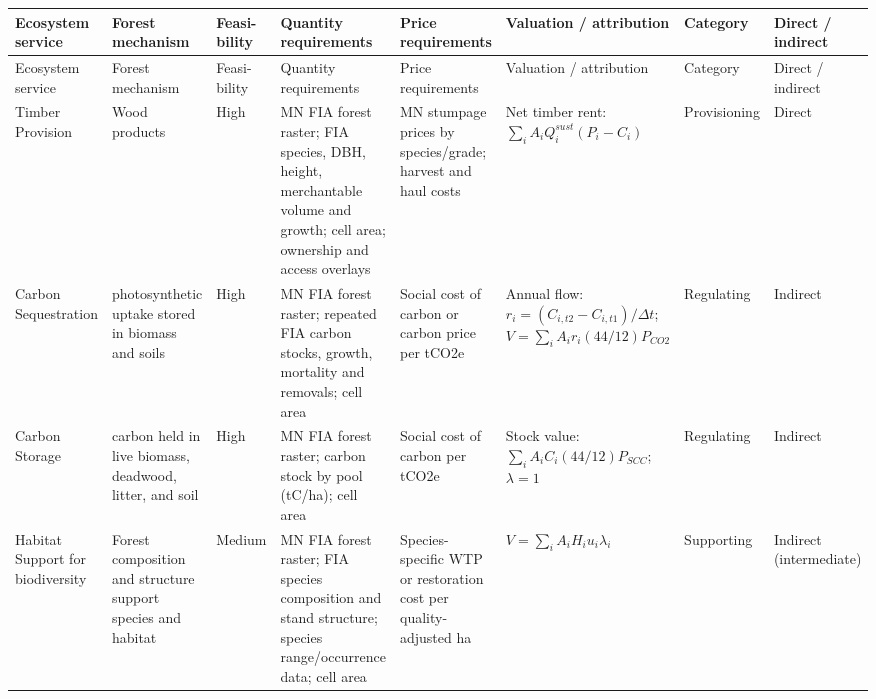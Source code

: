 \documentclass[11pt]{article}
\begin{document}
\begin{landscape}
\begingroup
\small
\setlength{\tabcolsep}{2pt}
\renewcommand{\arraystretch}{1.15}
\begin{longtable}{@{}
>{\RaggedRight\arraybackslash}p{0.95in}
>{\RaggedRight\arraybackslash}p{1.00in}
>{\RaggedRight\arraybackslash}p{0.55in}
>{\RaggedRight\arraybackslash}p{1.55in}
>{\RaggedRight\arraybackslash}p{1.25in}
>{\RaggedRight\arraybackslash}p{1.60in}
>{\RaggedRight\arraybackslash}p{0.80in}
>{\RaggedRight\arraybackslash}p{0.85in}@{}}
\toprule
Ecosystem service & Forest mechanism & Feasi-\newline bility & Quantity requirements & Price requirements & Valuation / attribution & Category & Direct / indirect \\
\midrule
\endfirsthead
\toprule
Ecosystem service & Forest mechanism & Feasi-\newline bility & Quantity requirements & Price requirements & Valuation / attribution & Category & Direct / indirect \\
\midrule
\endhead
\bottomrule
\endfoot
Timber Provision & Wood products & High & MN FIA forest raster; FIA species, DBH, height, merchantable volume and growth; cell area; ownership and access overlays & MN stumpage prices by species/grade; harvest and haul costs & Net timber rent:\newline $\sum_i A_i Q_i^{sust}(P_i-C_i)$ & Provisioning & Direct \\
Carbon Sequestration & photosynthetic uptake stored in biomass and soils & High & MN FIA forest raster; repeated FIA carbon stocks, growth, mortality and removals; cell area & Social cost of carbon or carbon price per tCO2e & Annual flow:\newline $r_i=(C_{i,t2}-C_{i,t1})/\Delta t$;\newline $V=\sum_i A_i r_i(44/12)P_{CO2}$ & Regulating & Indirect \\
Carbon Storage & carbon held in live biomass, deadwood, litter, and soil & High & MN FIA forest raster; carbon stock by pool (tC/ha); cell area & Social cost of carbon per tCO2e & Stock value:\newline $\sum_i A_i C_i(44/12)P_{SCC}$;\newline $\lambda=1$ & Regulating & Indirect \\
Habitat Support for biodiversity & Forest composition and structure support species and habitat & Medium & MN FIA forest raster; FIA species composition and stand structure; species range/occurrence data; cell area & Species-specific WTP or restoration cost per quality-adjusted ha & $V=\sum_i A_i H_i u_i\lambda_i$ & Supporting & Indirect (intermediate) \\


\end{longtable}
\end{landscape}
\end{document}
